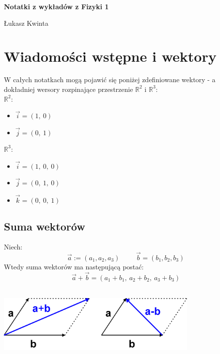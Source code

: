 \documentclass[a4paper]{article}
\date{}
\begin{document}
    \linespread{1.5}
    \begin{titlepage}
        \centering
        \vspace*{\fill}

        \vspace*{0.5cm}

        \huge\bfseries
        Notatki z wykładów z Fizyki 1

        \vspace*{0.5cm}

        \large Łukasz Kwinta

        \vspace*{\fill}
    \end{titlepage}
    
\pagebreak
\tableofcontents
\pagebreak

\section{\huge Wiadomości wstępne i wektory}
    \Large
    W całych notatkach mogą pojawić się poniżej zdefiniowane wektory - a dokładniej 
    wersory rozpinające przestrzenie $\mathbb{R}^2$ i $\mathbb{R}^3$:\\
    $\mathbb{R}^2$:
    \begin{itemize}
        \item [] $\vec{i} = (1,\ 0)$
        \item [] $\vec{j} = (0,\ 1)$
    \end{itemize}
    $\mathbb{R}^3$:
    \begin{itemize}
        \item [] $\vec{i} = (1,\ 0,\ 0)$
        \item [] $\vec{j} = (0,\ 1,\ 0)$
        \item [] $\vec{k} = (0,\ 0,\ 1)$
    \end{itemize}

    \subsection{\LARGE Suma wektorów}
        \Large 
        Niech:
        \[\vec{a} := (a_1, a_2, a_3) \hspace{1cm} \vec{b} = (b_1, b_2, b_3) \]
        Wtedy suma wektorów ma następującą postać:
        \[\vec{a} + \vec{b} = (a_1 + b_1,\ a_2 + b_2,\ a_3 + b_3)\] \\
        \begin{center}
            \includegraphics[width=10cm]{suma_wektorow.png} 
        \end{center}
        
\end{document}
